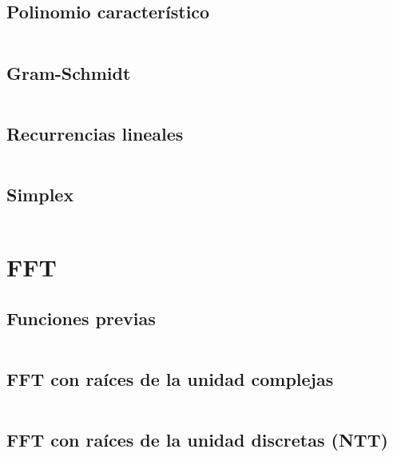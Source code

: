\documentclass[11pt]{article}
\begin{document}
		\subsection{Polinomio característico}
		\inputminted[tabsize=2,breaklines,firstline=287,lastline=297,fontsize=\small]{c++}{matrix.cpp}
		
		\subsection{Gram-Schmidt}
		\inputminted[tabsize=2,breaklines,firstline=299,lastline=315,fontsize=\small]{c++}{matrix.cpp}
		
		\subsection{Recurrencias lineales}
		\inputminted[tabsize=2,breaklines,firstline=7,lastline=38,fontsize=\small]{c++}{recurrence.cpp}
		
		\subsection{Simplex}
		\inputminted[tabsize=2,breaklines,fontsize=\small]{c++}{simplex.cpp}
		
		
	\newpage
	\section{FFT}
		\subsection{Funciones previas}
		\inputminted[tabsize=2,breaklines,firstline=3,lastline=11,fontsize=\small]{c++}{fft.cpp}
		
		\subsection{FFT con raíces de la unidad complejas}
		\inputminted[tabsize=2,breaklines,firstline=13,lastline=44,fontsize=\small]{c++}{fft.cpp}
		
		\subsection{FFT con raíces de la unidad discretas (NTT)}
		\inputminted[tabsize=2,breaklines,firstline=46,lastline=90,fontsize=\small]{c++}{fft.cpp}
\end{document}
